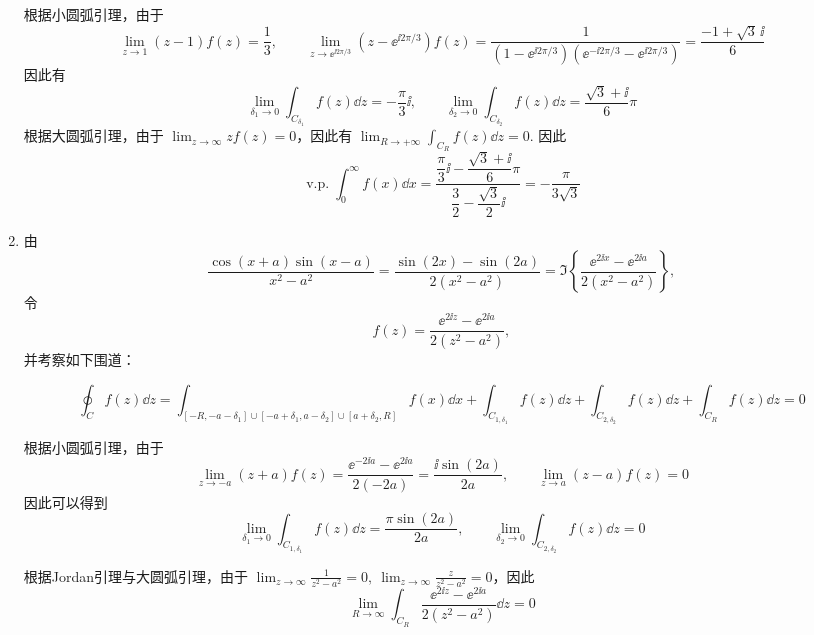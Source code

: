 \begin{question}
\begin{solution}
\begin{enumerate}
根据小圆弧引理，由于
\[
\lim_{z\to1}(z-1)f(z)=\frac13,\qquad \lim_{z\to\ee^{\ii2\pi/3}}(z-\ee^{\ii2\pi/3})f(z)=\frac{1}{(1-\ee^{\ii2\pi/3})(\ee^{-\ii2\pi/3}-\ee^{\ii2\pi/3})}=\frac{-1+\sqrt3\,\ii}{6}
\]
因此有
\[
\lim_{\delta_1\to0}\int_{C_{\delta_1}}f(z)\dd{z}=-\frac{\pi}{3}\ii,\qquad \lim_{\delta_2\to0}\int_{C_{\delta_2}}f(z)\dd{z}=\frac{\sqrt3+\ii}{6}\pi
\]
根据大圆弧引理，由于 \(\displaystyle\lim_{z\to\infty}zf(z)=0\)，因此有 \(\displaystyle\lim_{R\to+\infty}\int_{C_R}f(z)\dd{z}=0\). 因此
\[
\operatorname{v.p.}\int_{0}^{\infty}f(x)\dd{x}=\frac{\dfrac{\pi}{3}\ii-\dfrac{\sqrt3+\ii}{6}\pi}{\dfrac32-\dfrac{\sqrt3}{2}\ii}=-\frac{\pi}{3\sqrt3}
\]

  \item 由
  \[
  \frac{\cos(x+a)\sin(x-a)}{x^2-a^2}
  =\frac{\sin(2x)-\sin(2a)}{2(x^2-a^2)}
  =\Im\left\{\frac{\ee^{2\ii x}-\ee^{2\ii a}}
  {2(x^2-a^2)}\right\},
  \]
  令
  \[
  f(z)=\frac{\ee^{2\ii z}-\ee^{2\ii a}}{2(z^2-a^2)},
  \]
  并考察如下围道：

\begin{center}
\end{center}

\[
\oint_C f(z)\dd{z}=\int_{[-R,-a-\delta_1]\cup[-a+\delta_1,a-\delta_2]\cup[a+\delta_2,R]}f(x)\dd{x}+\int_{C_{1,\delta_1}}f(z)\dd{z}+\int_{C_{2,\delta_2}}f(z)\dd{z}+\int_{C_R}f(z)\dd{z}=0
\]

根据小圆弧引理，由于
\[
\lim_{z\to-a}(z+a)f(z)=\frac{\ee^{-2\ii a}-\ee^{2\ii a}}{2(-2a)}=\frac{\ii\sin(2a)}{2a},\qquad \lim_{z\to a}(z-a)f(z)=0
\]
因此可以得到
\[
\lim_{\delta_1\to0}\int_{C_{1,\delta_1}}f(z)\dd{z}=\frac{\pi\sin(2a)}{2a},\qquad \lim_{\delta_2\to0}\int_{C_{2,\delta_2}}f(z)\dd{z}=0
\]

根据Jordan引理与大圆弧引理，由于 \(\displaystyle\lim_{z\to\infty}\frac{1}{z^2-a^2}=0,\ \lim_{z\to\infty}\frac{z}{z^2-a^2}=0\)，因此
\[
\lim_{R\to\infty}\int_{C_R}\frac{\ee^{2\ii z}-\ee^{2\ii a}}{2(z^2-a^2)}\dd{z}=0
\]


\end{enumerate}
\end{solution}
\end{question}
